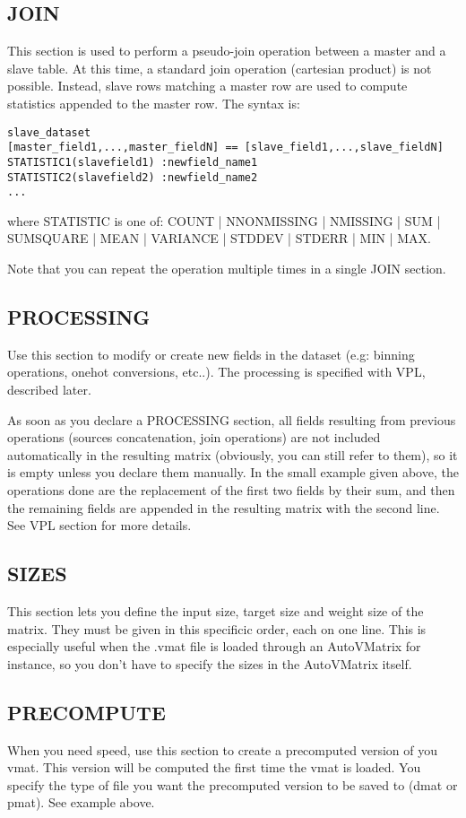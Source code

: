 \documentclass[11pt]{book}
\begin{document}
\subsection{JOIN}

This section is used to perform a pseudo-join operation between a master and a slave table. At this time, a standard join operation (cartesian product) is not possible. Instead, slave rows matching a master row are used to compute statistics appended to the master row. The syntax is:

\begin{verbatim}
slave_dataset
[master_field1,...,master_fieldN] == [slave_field1,...,slave_fieldN]
STATISTIC1(slavefield1) :newfield_name1
STATISTIC2(slavefield2) :newfield_name2
...
\end{verbatim}
where STATISTIC is one of: {COUNT | NNONMISSING | NMISSING | SUM | SUMSQUARE | MEAN | VARIANCE | STDDEV | STDERR | MIN | MAX}. 

Note that you can repeat the operation multiple times in a single JOIN section.

\subsection{PROCESSING}
Use this section to modify or create new fields in the dataset (e.g: binning operations, onehot conversions, etc..). The processing is specified with VPL, described later.

As soon as you declare a PROCESSING section, all fields resulting from previous operations (sources concatenation, join operations) are not included automatically in the resulting matrix (obviously, you can still refer to them), so it is empty unless you declare them manually. In the small example given above, the operations done are the replacement of the first two fields by their sum, and then the remaining fields are appended in the resulting matrix with the second line. See VPL section for more details.

\subsection{SIZES}
This section lets you define the input size, target size and weight size of the matrix.
They must be given in this specificic order, each on one line.
This is especially useful when the .vmat file is loaded through an AutoVMatrix for instance, so
you don't have to specify the sizes in the AutoVMatrix itself.

\subsection{PRECOMPUTE}
When you need speed, use this section to create a precomputed version of you vmat. This version will be computed the first time the vmat is loaded. You specify the type of file you want the precomputed version to be saved to (dmat or pmat). See example above.
\end{document}
